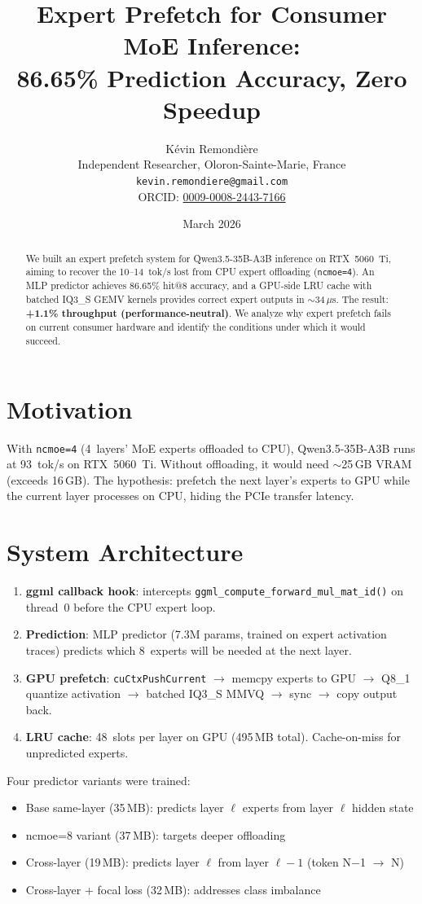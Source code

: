 \documentclass[10pt,a4paper]{article}
\title{Expert Prefetch for Consumer MoE Inference:\\86.65\% Prediction Accuracy, Zero Speedup}
\author{
  K\'evin Remondi\`ere\\
  Independent Researcher, Oloron-Sainte-Marie, France\\
  \texttt{kevin.remondiere@gmail.com}\\
  ORCID: \href{https://orcid.org/0009-0008-2443-7166}{0009-0008-2443-7166}
}
\date{March 2026}
\begin{document}
\maketitle

\begin{abstract}
We built an expert prefetch system for Qwen3.5-35B-A3B inference on RTX~5060~Ti, aiming to recover the 10--14~tok/s lost from CPU expert offloading (\texttt{ncmoe=4}). An MLP predictor achieves 86.65\% hit@8 accuracy, and a GPU-side LRU cache with batched IQ3\_S GEMV kernels provides correct expert outputs in $\sim$34\,$\mu$s. The result: \textbf{+1.1\% throughput (performance-neutral)}. We analyze why expert prefetch fails on current consumer hardware and identify the conditions under which it would succeed.
\end{abstract}

\section{Motivation}

With \texttt{ncmoe=4} (4~layers' MoE experts offloaded to CPU), Qwen3.5-35B-A3B runs at 93~tok/s on RTX~5060~Ti. Without offloading, it would need $\sim$25\,GB VRAM (exceeds 16\,GB). The hypothesis: prefetch the next layer's experts to GPU while the current layer processes on CPU, hiding the PCIe transfer latency.

\section{System Architecture}

\begin{enumerate}
  \item \textbf{ggml callback hook}: intercepts \texttt{ggml\_compute\_forward\_mul\_mat\_id()} on thread~0 before the CPU expert loop.
  \item \textbf{Prediction}: MLP predictor (7.3M params, trained on expert activation traces) predicts which 8~experts will be needed at the next layer.
  \item \textbf{GPU prefetch}: \texttt{cuCtxPushCurrent} $\to$ memcpy experts to GPU $\to$ Q8\_1 quantize activation $\to$ batched IQ3\_S MMVQ $\to$ sync $\to$ copy output back.
  \item \textbf{LRU cache}: 48~slots per layer on GPU (495\,MB total). Cache-on-miss for unpredicted experts.
\end{enumerate}

Four predictor variants were trained:
\begin{itemize}
  \item Base same-layer (35\,MB): predicts layer $\ell$ experts from layer $\ell$ hidden state
  \item ncmoe=8 variant (37\,MB): targets deeper offloading
  \item Cross-layer (19\,MB): predicts layer $\ell$ from layer $\ell{-}1$ (token N$-$1 $\to$ N)
  \item Cross-layer + focal loss (32\,MB): addresses class imbalance
\end{itemize}
\end{document}
